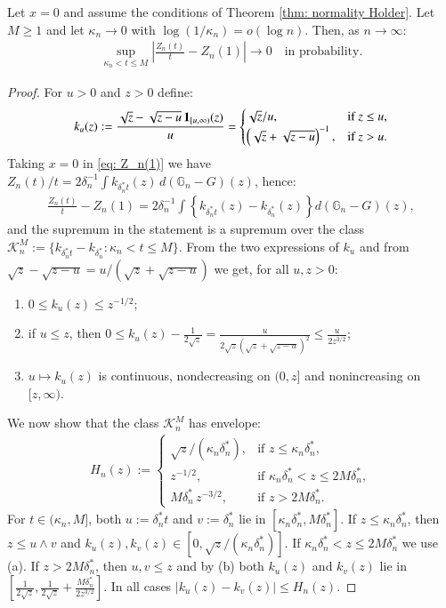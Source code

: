 \begin{lemma}\label{lemma: uniform collapse}
Let $x=0$ and assume the conditions of Theorem \ref{thm: normality Holder}. Let $M \geq 1$ and let $\kappa_n \rightarrow 0$ with $\log(1/\kappa_n) = o(\log n)$. Then, as $n \rightarrow \infty$:
\begin{align*}
\sup_{\kappa_n < t \leq M} \left|\frac{Z_n(t)}{t} - Z_n(1)\right| \rightarrow 0 \quad \text{in probability.}
\end{align*}
\end{lemma}
\begin{proof}
For $u>0$ and $z>0$ define:
\begin{align*}
k_u(z) := \frac{\sqrt{z}-\sqrt{z-u}\,\mathbf{1}_{[u,\infty)}(z)}{u} = \begin{cases} \sqrt{z}/u, & \text{if } z \leq u, \\ \left(\sqrt{z}+\sqrt{z-u}\right)^{-1}, & \text{if } z > u. \end{cases}
\end{align*}
Taking $x=0$ in \eqref{eq: Z_n(1)} we have $Z_n(t)/t = 2\delta_n^{-1}\int k_{\delta^*_n t}(z)\, d(\mathbb{G}_n-G)(z)$, hence:
\begin{align}\label{eq: uniform collapse empirical}
\frac{Z_n(t)}{t} - Z_n(1) = 2\delta_n^{-1}\int \left\{k_{\delta^*_n t}(z) - k_{\delta^*_n}(z)\right\} d(\mathbb{G}_n-G)(z),
\end{align}
and the supremum in the statement is a supremum over the class $\mathscr{K}^M_n := \{k_{\delta^*_n t} - k_{\delta^*_n} : \kappa_n < t \leq M\}$. From the two expressions of $k_u$ and from $\sqrt{z}-\sqrt{z-u} = u/(\sqrt{z}+\sqrt{z-u})$ we get, for all $u,z>0$:
\begin{enumerate}[label=(\alph*)]
\item $0 \leq k_u(z) \leq z^{-1/2}$;
\item if $u \leq z$, then $0 \leq k_u(z) - \frac{1}{2\sqrt{z}} = \frac{u}{2\sqrt{z}(\sqrt{z}+\sqrt{z-u})^2} \leq \frac{u}{2z^{3/2}}$;
\item $u \mapsto k_u(z)$ is continuous, nondecreasing on $(0,z]$ and nonincreasing on $[z,\infty)$.
\end{enumerate}
We now show that the class $\mathscr{K}^M_n$ has envelope:
\begin{align*}
H_n(z) := \begin{cases} \sqrt{z}/(\kappa_n\delta^*_n), & \text{if } z \leq \kappa_n\delta^*_n, \\ z^{-1/2}, & \text{if } \kappa_n\delta^*_n < z \leq 2M\delta^*_n, \\ M\delta^*_n\, z^{-3/2}, & \text{if } z > 2M\delta^*_n. \end{cases}
\end{align*}
For $t \in (\kappa_n, M]$, both $u := \delta^*_n t$ and $v := \delta^*_n$ lie in $[\kappa_n\delta^*_n, M\delta^*_n]$. If $z \leq \kappa_n\delta^*_n$, then $z \leq u \wedge v$ and $k_u(z), k_v(z) \in [0, \sqrt{z}/(\kappa_n\delta^*_n)]$. If $\kappa_n\delta^*_n < z \leq 2M\delta^*_n$ we use (a). If $z > 2M\delta^*_n$, then $u,v \leq z$ and by (b) both $k_u(z)$ and $k_v(z)$ lie in $[\frac{1}{2\sqrt{z}}, \frac{1}{2\sqrt{z}} + \frac{M\delta^*_n}{2z^{3/2}}]$. In all cases $|k_u(z)-k_v(z)| \leq H_n(z)$.


\end{proof}
